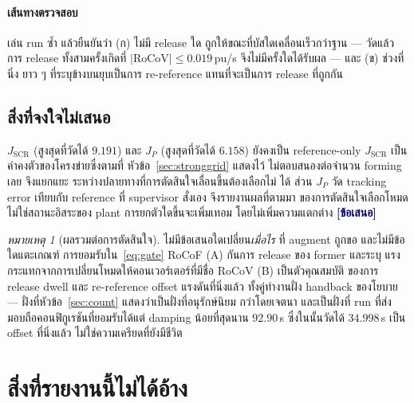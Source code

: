 \documentclass[12pt,a4paper]{article}
\theoremstyle{remark}
\newtheorem{remark}{หมายเหตุ}
\newcommand{\proposed}{\textcolor{navy}{\textbf{[ข้อเสนอ]}}}
\begin{document}
\paragraph{เส้นทางตรวจสอบ} เล่น run ซ้ำ แล้วยืนยันว่า (ก) ไม่มี release ใด
ถูกให้ขณะที่บัสใดเคลื่อนเร็วกว่าฐาน --- วัดแล้ว การ release ทั้งสามครั้งเกิดที่
$|\mathrm{RoCoV}| \le 0.019$\,pu/s จึงไม่มีครั้งใดได้รับผล --- และ (ข) ช่วงที่นิ่ง
ยาว ๆ ที่ระบุข้างบนยุบเป็นการ re-reference แทนที่จะเป็นการ release ที่ถูกกัน

\subsection{สิ่งที่จงใจไม่เสนอ}

$J_{\text{SCR}}$ (สูงสุดที่วัดได้ $9.191$) และ $J_P$ (สูงสุดที่วัดได้ $6.158$)
ยังคงเป็น reference-only $J_{\text{SCR}}$ เป็นค่าคงตัวของโครงข่ายซึ่งตามที่
หัวข้อ~\ref{sec:stronggrid} แสดงไว้ ไม่ตอบสนองต่อจำนวน forming เลย จึงแยกแยะ
ระหว่างปลายทางที่การตัดสินใจเลื่อนขึ้นต้องเลือกไม่ ได้ ส่วน $J_P$ วัด
tracking error เทียบกับ reference ที่ supervisor สั่งเอง จึงรายงานผลที่ตามมา
ของการตัดสินใจเลือกโหมด ไม่ใช่สถานะอิสระของ plant การยกตัวใดขึ้นจะเพิ่มเทอม
โดยไม่เพิ่มความแตกต่าง \proposed

\begin{remark}[ผลรวมต่อการตัดสินใจ]
ไม่มีข้อเสนอใดเปลี่ยน\emph{เมื่อไร} ที่ augment ถูกขอ และไม่มีข้อใดแตะเกณฑ์
การยอมรับใน~\eqref{eq:gate} RoCoF (A) กันการ release ของ former และระบุ
แรงกระแทกจากการเปลี่ยนโหมดให้คอนเวอร์เตอร์ที่มีชื่อ RoCoV (B) เป็นตัวคุณสมบัติ
ของการ release dwell และ re-reference offset แรงดันที่นิ่งแล้ว ทั้งคู่ทำงานฝั่ง
handback ของโยบาย --- ฝั่งที่หัวข้อ~\ref{sec:count} แสดงว่าเป็นฝั่งที่อนุรักษ์นิยม
กว่าโดยเจตนา และเป็นฝั่งที่ run ที่ส่งมอบถือคอนฟิกูเรชันที่ยอมรับได้แต่ damping
น้อยที่สุดนาน $92.90$\,s ซึ่งในนั้นวัดได้ $34.998$\,s เป็น offset ที่นิ่งแล้ว
ไม่ใช่ความเครียดที่ยังมีชีวิต
\end{remark}

\section{สิ่งที่รายงานนี้ไม่ได้อ้าง}\label{sec:notclaimed}
\end{document}
